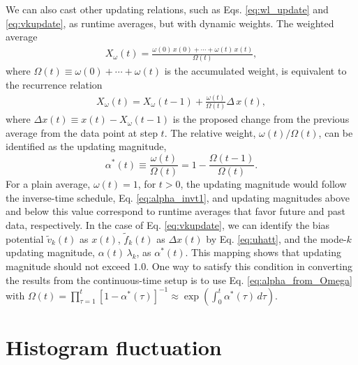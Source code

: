 \documentclass[reprint, superscriptaddress, floatfix]{revtex4-1}
\begin{document}
We can also cast other updating relations,
such as Eqs. \eqref{eq:wl_update}
and \eqref{eq:vkupdate},
as runtime averages,
but with dynamic weights.
%
The weighted average
%
\begin{align*}
  X_\omega(t)
  =
  \frac{
    \omega(0) \, x(0) + \cdots + \omega(t) \, x(t)
  }
  {
    \Omega(t)
  }
  ,
\end{align*}
%
where
$\Omega(t) \equiv \omega(0) + \cdots + \omega(t)$
is the accumulated weight,
is equivalent to the recurrence relation
%
\begin{align*}
X_\omega(t) = X_\omega(t-1)
  + \frac{\omega(t)}{\Omega(t)}
  \Delta \, x(t)
,
\end{align*}
where
$\Delta x(t) \equiv x(t) - X_\omega(t-1)$
is the proposed change from the previous average
from the data point at step $t$.
%
The relative weight, $\omega(t)/\Omega(t)$,
can be identified as the updating magnitude,
\begin{equation}
  \alpha^*(t) \equiv
  \frac{ \omega(t) } {\Omega(t)}
  =
  1 - \frac{ \Omega(t-1) } {\Omega(t)}
  .
  \label{eq:alpha_from_Omega}
\end{equation}
%
For a plain average, $\omega(t) = 1$, for $t > 0$,
the updating magnitude would follow
the inverse-time schedule, Eq. \eqref{eq:alpha_invt1},
and updating magnitudes above and below this value
correspond to runtime averages that favor future and past data,
respectively.
%
In the case of Eq. \eqref{eq:vkupdate},
we can identify
the bias potential $\tilde v_k(t)$
as $x(t)$,
$\tilde f_k(t)$ as $\Delta x(t)$
by Eq. \eqref{eq:uhatt},
and
the mode-$k$ updating magnitude,
$\alpha(t) \, \lambda_k$,
as $\alpha^*(t)$.
%
This mapping shows that
updating magnitude should not exceed $1.0$.
%
One way to satisfy this condition
in converting the results
from the continuous-time setup is
to use Eq. \eqref{eq:alpha_from_Omega}
with
$\Omega(t) = \prod_{\tau=1}^t [1- \alpha^*(\tau)]^{-1}
\approx \exp\left(\int_0^t \alpha^*(\tau) \, d\tau \right)$.
%








\section{\label{sec:hfluc}
Histogram fluctuation}
\end{document}
